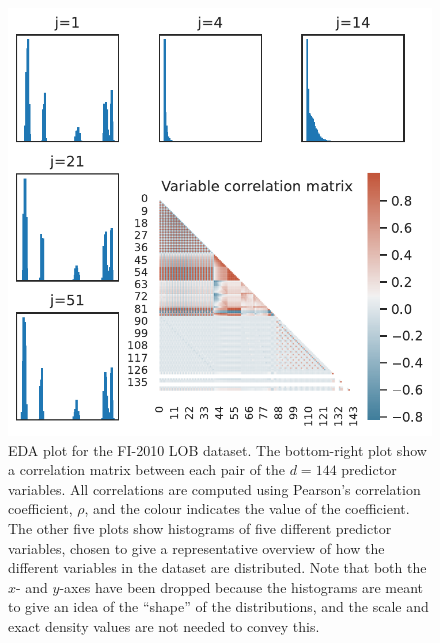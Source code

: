 \documentclass{statsmsc}
\begin{document}
{%
\begin{figure}
    \begin{center}
        \includegraphics[scale=1]{figures/lob_data_eda_plot.pdf}
    \end{center}
    \caption{
        \ac{EDA} plot for the FI-2010 \ac{LOB} dataset.
        The bottom-right plot show a correlation matrix between each pair
        of the $d=144$ predictor variables. All correlations are computed using
        Pearson's correlation coefficient, $\rho$, and the colour indicates the
        value of the coefficient.  The other five plots show histograms of five
        different predictor variables, chosen to give a representative overview of
        how the different variables in the dataset are distributed.
        Note that both the $x$- and $y$-axes have been dropped because the histograms
        are meant to give an idea of the ``shape'' of the distributions, and 
        the scale and exact density values are not needed to convey this.
    }
    \label{fig:lob_eda}
\end{figure}


}
\end{document}
